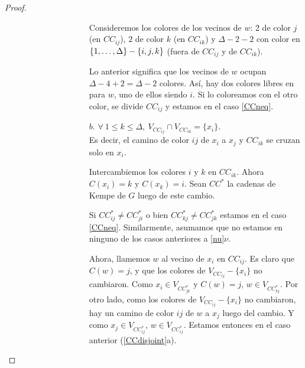 \begin{proof}
\begin{enumerate}
\begin{enumerate}
\begin{enumerate}
\begin{itemize}
\begin{enumerate}
\begin{itemize}
            Consideremos los colores de los vecinos de $w$: 2 de color $j$ (en $CC_{ij}$), $2$ de color $k$ (en $CC_{ik}$) y $\Delta - 2 - 2$ con color en $\{1, \mathellipsis, \Delta\} - \{i, j, k\}$ (fuera de $CC_{ij}$ y de $CC_{ik}$).
            
            Lo anterior significa que los vecinos de $w$ ocupan $\Delta - 4 + 2 = \Delta - 2$ colores. Así, hay dos colores libres en para $w$, uno de ellos siendo $i$. Si lo coloreamos con el otro color, se divide $CC_{ij}$ y estamos en el caso \ref{CCneq}.

    \item[$b.$] $\forall~ 1 \le k \le \Delta,~ V_{CC_{ij}} \cap V_{CC_{ik}} = \{x_i\}$.\\
    Es decir, el camino de color $ij$ de $x_i$ a $x_j$ y $CC_{ik}$ se cruzan solo en $x_i$.
    
    Intercambiemos los colores $i$ y $k$ en $CC_{ik}$.  Ahora $C(x_i) = k$ y $C(x_k) = i$. Sean $CC^{*}$ la cadenas de Kempe de $G$ luego de este cambio.
    
    Si $CC_{ij}^{*} \ne CC_{ji}^{*}$ o bien $CC_{kj}^{*} \neq CC_{jk}^{*}$ estamos en el caso \ref{CCneq}. Similarmente, asumamos que no estamos en ninguno de los casos anteriores a \ref{nu}$\nu$.
    
    Ahora, llamemos $w$ al vecino de $x_i$ en $CC_{ij}$. Es claro que $C(w) = j$, y que los colores de $V_{CC_{ij}} - \{x_i\}$ no cambiaron. Como $x_i \in V_{CC_{jk}^{*}}$ y $C(w) = j$, $w \in V_{CC_{kj}^{*}}$. Por otro lado, como los colores de $V_{CC_{ij}} - \{x_i\}$ no cambiaron, hay un camino de color $ij$ de $w$ a $x_j$ luego del cambio. Y como $x_j \in V_{CC_{ij}^{*}}$, $w \in V_{CC_{ij}^{*}}$. Estamos entonces en el caso anterior (\ref{CCdisjoint}a).
\end{itemize}
\end{enumerate}
\end{itemize}
\end{enumerate}
\end{enumerate}
\end{enumerate}
\end{proof}